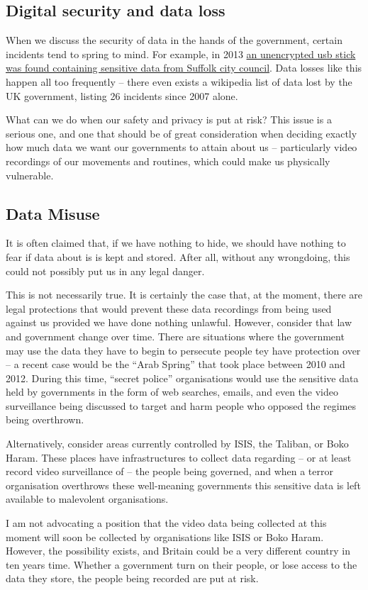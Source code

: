 \documentclass[10pt, draft]{article}
\begin{document}
\subsection{Digital security and data loss}\par
When we discuss the security of data in the hands of the government, certain incidents tend to spring to mind. For example, in 2013 \href{http://www.ipswichstar.co.uk/news/ipswich_suffolk_inquiry_starts_after_memory_stick_lost_by_county_1_3058290}{an unencrypted usb stick was found containing sensitive data from Suffolk city council}. Data losses like this happen all too frequently -- there even exists a wikipedia list of data lost by the UK government, listing 26 incidents since 2007 alone. \par
What can we do when our safety and privacy is put at risk? This issue is a serious one, and one that should be of great consideration when deciding exactly how much data we want our governments to attain about us -- particularly video recordings of our movements and routines, which could make us physically vulnerable. \par

\subsection{Data Misuse}\par
It is often claimed that, if we have nothing to hide, we should have nothing to fear if data about is is kept and stored. After all, without any wrongdoing, this could not possibly put us in any legal danger. \par
This is not necessarily true. It is certainly the case that, at the moment, there are legal protections that would prevent these data recordings from being used against us provided we have done nothing unlawful. However, consider that law and government change over time. There are situations where the government may use the data they have to begin to persecute people tey have protection over -- a recent case would be the ``Arab Spring'' that took place between 2010 and 2012. During this time, ``secret police'' organisations would use the sensitive data held by governments in the form of web searches, emails, and even the video surveillance being discussed to target and harm people who opposed the regimes being overthrown. \par
Alternatively, consider areas currently controlled by ISIS, the Taliban, or Boko Haram. These places have infrastructures to collect data regarding -- or at least record video surveillance of -- the people being governed, and when a terror organisation overthrows these well-meaning governments this sensitive data is left available to malevolent organisations. \par
I am not advocating a position that the video data being collected at this moment will soon be collected by organisations like ISIS or Boko Haram. However, the possibility exists, and Britain could be a very different country in ten years time. Whether a government turn on their people, or lose access to the data they store, the people being recorded are put at risk. \par
\end{document}
